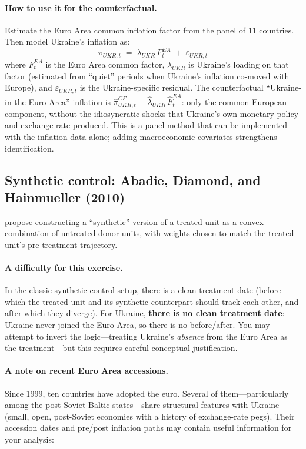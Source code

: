 \documentclass[11pt,a4paper]{article}
\begin{document}
\paragraph{How to use it for the counterfactual.}
Estimate the Euro Area common inflation factor from the panel of 11 countries.
Then model Ukraine's inflation as:
\[
  \pi_{UKR,t} \;=\; \lambda_{UKR}\, F_t^{EA} \;+\; \varepsilon_{UKR,t}
\]
where $F_t^{EA}$ is the Euro Area common factor, $\lambda_{UKR}$ is Ukraine's
loading on that factor (estimated from ``quiet'' periods when Ukraine's
inflation co-moved with Europe), and $\varepsilon_{UKR,t}$ is the
Ukraine-specific residual. The counterfactual ``Ukraine-in-the-Euro-Area''
inflation is $\hat{\pi}_{UKR,t}^{CF} = \hat{\lambda}_{UKR}\, \hat{F}_t^{EA}$:
only the common European component, without the idiosyncratic shocks that
Ukraine's own monetary policy and exchange rate produced. This is a panel
method that can be implemented with the inflation data alone; adding
macroeconomic covariates strengthens identification.


\subsection*{Synthetic control: Abadie, Diamond, and Hainmueller (2010)}

\citet{abadie_diamond_hainmueller2010} propose constructing a ``synthetic''
version of a treated unit as a convex combination of untreated donor units,
with weights chosen to match the treated unit's pre-treatment trajectory.

\paragraph{A difficulty for this exercise.}
In the classic synthetic control setup, there is a clean treatment date (before
which the treated unit and its synthetic counterpart should track each other,
and after which they diverge). For Ukraine, \textbf{there is no clean treatment
date}: Ukraine never joined the Euro Area, so there is no before/after. You may
attempt to invert the logic---treating Ukraine's \emph{absence} from the Euro
Area as the treatment---but this requires careful conceptual justification.

\paragraph{A note on recent Euro Area accessions.}
Since 1999, ten countries have adopted the euro. Several of them---particularly
among the post-Soviet Baltic states---share structural features with Ukraine
(small, open, post-Soviet economies with a history of exchange-rate pegs).
Their accession dates and pre/post inflation paths may contain useful
information for your analysis:
\end{document}
